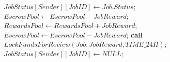 \documentclass{article}
\begin{document}
\begin{algorithm}
\begin{algorithmic}[1]
    \vspace{1mm}
        \vspace{1mm}
        \State $JobStatus[Sender][JobID] \gets Job.Status$;\vspace{1mm}
        \EndIf\vspace{1mm}
    \EndWhile\vspace{1mm}
    \vspace{1mm}
        \State $EscrowPool \gets EscrowPool - JobReward$;\vspace{1mm}
        \State $RewardsPool \gets RewardsPool + JobReward$;\vspace{1mm}        
    \Else{}\vspace{1mm}
        \State $EscrowPool \gets EscrowPool - JobReward$;\vspace{1mm}
        \State \textbf{call} $LockFundsForReview(Job, JobReward, TIME\_24H);$ \vspace{1mm}
    \EndIf\vspace{1mm}
    \State $JobStatus[Sender][JobID] \gets NULL$;\vspace{1mm}
\end{algorithmic}
\end{algorithm}
\end{document}
